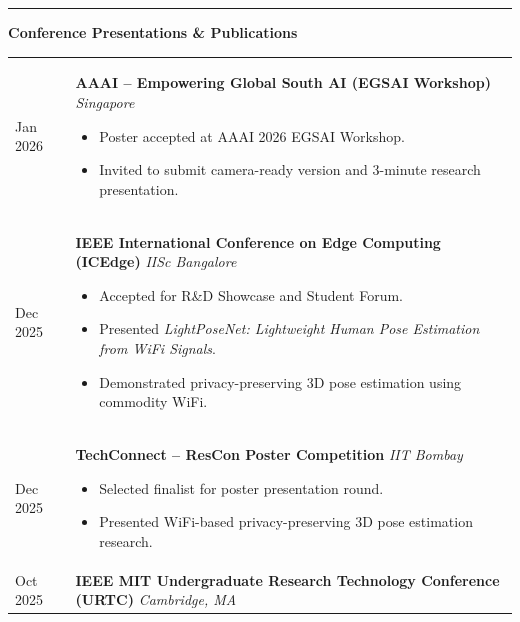 \documentclass[11pt]{article}
\newcommand{\cvsection}[1]{%
\vspace{12pt}%
\noindent%
{\color{headingblue}\rule{40pt}{5pt}}%
\hspace{10pt}%
{\Large\textbf{\color{headingblue}#1}}%
\vspace{6pt}%
\color{black}%
}
\begin{document}


\cvsection{Conference Presentations \& Publications}

\begingroup
\renewcommand{\arraystretch}{1.1}
\begin{longtable}{@{}p{95pt}p{\dimexpr\textwidth-95pt\relax}@{}}

Jan 2026 &
\textbf{AAAI – Empowering Global South AI (EGSAI Workshop)} \hfill \textit{Singapore}

\begin{itemize}[leftmargin=*,nosep]
\item Poster accepted at AAAI 2026 EGSAI Workshop.
\item Invited to submit camera-ready version and 3-minute research presentation.
\end{itemize}
\\[6pt]

Dec 2025 &
\textbf{IEEE International Conference on Edge Computing (ICEdge)} \hfill \textit{IISc Bangalore}

\begin{itemize}[leftmargin=*,nosep]
\item Accepted for R\&D Showcase and Student Forum.
\item Presented \textit{LightPoseNet: Lightweight Human Pose Estimation from WiFi Signals}.
\item Demonstrated privacy-preserving 3D pose estimation using commodity WiFi.
\end{itemize}
\\[6pt]

Dec 2025 &
\textbf{TechConnect – ResCon Poster Competition} \hfill \textit{IIT Bombay}

\begin{itemize}[leftmargin=*,nosep]
\item Selected finalist for poster presentation round.
\item Presented WiFi-based privacy-preserving 3D pose estimation research.
\end{itemize}
\\[6pt]

Oct 2025 &
\textbf{IEEE MIT Undergraduate Research Technology Conference (URTC)} \hfill \textit{Cambridge, MA}


\end{longtable}
\end{document}
